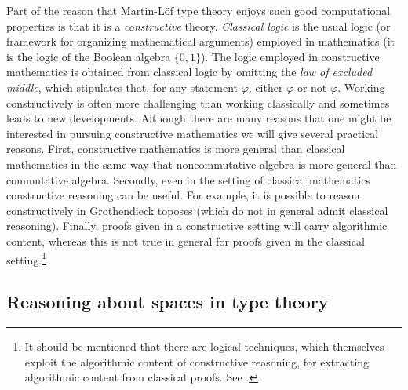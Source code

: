 \documentclass{amsart}
\theoremstyle{definition}
\theoremstyle{remark}
\numberwithin{equation}{section}
\begin{document}
Part of the reason that Martin-L\"{o}f type theory enjoys such good
computational properties is that it is a \emph{constructive} theory.
\emph{Classical logic} is the usual logic (or framework for
organizing mathematical arguments) employed in mathematics (it is the
logic of the Boolean algebra $\{0,1\}$).  The logic employed in
constructive mathematics is obtained from classical logic by omitting
the \emph{law of excluded middle}, which stipulates that, for any
statement $\varphi$, either $\varphi$ or not $\varphi$.  Working
constructively is often more challenging than working classically and
sometimes leads to new developments.  Although there are many reasons that one
might be interested in pursuing constructive mathematics we will give
several practical reasons.  First, constructive mathematics is more
general than classical mathematics in the same way that noncommutative
algebra is more general than commutative algebra.  Secondly, even in
the setting of classical mathematics constructive reasoning can be
useful.  For example, it is possible to reason constructively in
Grothendieck toposes (which do not in general admit classical
reasoning).  Finally, proofs given in a constructive setting will
carry algorithmic content, whereas this is not true in general for
proofs given in the classical setting.\footnote{It should be mentioned
  that there are logical techniques, which themselves exploit the algorithmic content of constructive reasoning, for
  extracting algorithmic content from classical proofs.  See \cite{Kohlenbach:APT}.}

\subsection{Reasoning about spaces in type theory}
\end{document}
